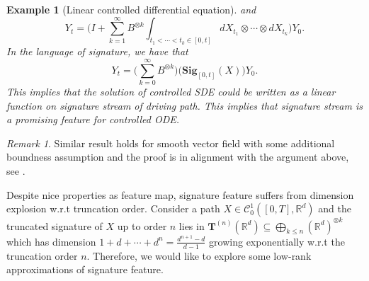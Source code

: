 \documentclass[12pt]{report}
\newtheorem{example}[theorem]{Example}
\theoremstyle{definition}
\theoremstyle{remark}
\newtheorem*{remark}{Remark}
\newcommand{\R}{\mathbb{R}}
\begin{document}
\begin{example}[Linear controlled differential equation]
  and
  \begin{equation} 
    Y_{t} = \Bigg(I + \sum_{k=1}^{\infty}B^{\otimes k}\int_{t_{1}<\cdots< t_{k} \in [0,t]}dX_{t_{1}}\otimes\cdots\otimes dX_{t_{k}}\Bigg) Y_{0}.
  \end{equation}
  In the language of signature, we have that 
  \begin{equation} 
    Y_{t} = \Big(\sum_{k=0}^{\infty}B^{\otimes k}\Big) \Big(\mathbf{Sig}_{[0,t]}(X)\Big) Y_{0}.
  \end{equation}
 This implies that the solution of controlled SDE could be written as a linear function on signature stream of driving path. This implies that signature stream is a promising feature for controlled ODE.
\end{example}
\begin{remark}
  Similar result holds for smooth vector field with some additional boundness assumption and the proof is in alignment with the argument above, see \cite{liao2019learning}. 
\end{remark}
Despite nice properties as feature map, signature feature suffers from dimension explosion w.r.t truncation order. Consider a path $X \in \mathcal{C}^{1}_{0}([0,T],\R^{d})$ and the truncated signature of $X$ up to order $n$ lies in $\mathbf{T}^{(n)}(\R^{d}) \subseteq \bigoplus_{k\leq n} (\R^{d})^{\otimes k} $ which has dimension $1 + d + \cdots + d^{n} = \frac{d^{n+1} - d}{d-1}$ growing exponentially w.r.t the truncation order $n$. Therefore, we would like to explore some low-rank approximations of signature feature. 
\end{document}
